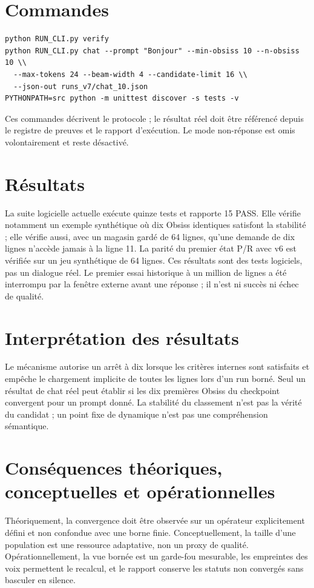 \documentclass[11pt,a4paper]{report}
\begin{document}
\section{Commandes}
\begin{verbatim}
python RUN_CLI.py verify
python RUN_CLI.py chat --prompt "Bonjour" --min-obsiss 10 --n-obsiss 10 \\
  --max-tokens 24 --beam-width 4 --candidate-limit 16 \\
  --json-out runs_v7/chat_10.json
PYTHONPATH=src python -m unittest discover -s tests -v
\end{verbatim}
Ces commandes décrivent le protocole ; le résultat réel doit être référencé depuis le registre de preuves et le rapport d'exécution. Le mode non-réponse est omis volontairement et reste désactivé.
\section{Résultats}
La suite logicielle actuelle exécute quinze tests et rapporte 15 PASS. Elle vérifie notamment un exemple synthétique où dix Obsiss identiques satisfont la stabilité ; elle vérifie aussi, avec un magasin gardé de 64 lignes, qu'une demande de dix lignes n'accède jamais à la ligne 11. La parité du premier état P/R avec v6 est vérifiée sur un jeu synthétique de 64 lignes. Ces résultats sont des tests logiciels, pas un dialogue réel. Le premier essai historique à un million de lignes a été interrompu par la fenêtre externe avant une réponse ; il n'est ni succès ni échec de qualité.
\section{Interprétation des résultats}
Le mécanisme autorise un arrêt à dix lorsque les critères internes sont satisfaits et empêche le chargement implicite de toutes les lignes lors d'un run borné. Seul un résultat de chat réel peut établir si les dix premières Obsiss du checkpoint convergent pour un prompt donné. La stabilité du classement n'est pas la vérité du candidat ; un point fixe de dynamique n'est pas une compréhension sémantique.
\section{Conséquences théoriques, conceptuelles et opérationnelles}
Théoriquement, la convergence doit être observée sur un opérateur explicitement défini et non confondue avec une borne finie. Conceptuellement, la taille d'une population est une ressource adaptative, non un proxy de qualité. Opérationnellement, la vue bornée est un garde-fou mesurable, les empreintes des voix permettent le recalcul, et le rapport conserve les statuts non convergés sans basculer en silence.
\end{document}
